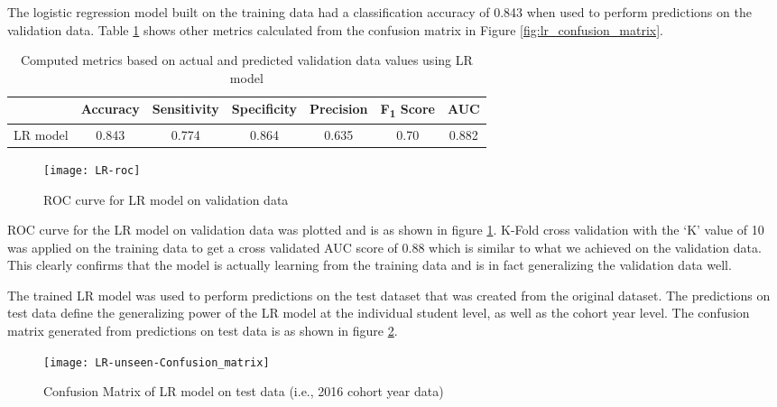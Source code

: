 \documentclass[11pt,openright]{report}
\begin{document}
The logistic regression model built on the training data had a classification accuracy of 0.843 when used to perform predictions on the validation data. Table \ref{table:lr-metrics_db} shows other metrics calculated from the confusion matrix in Figure \ref{fig:lr_confusion_matrix}. 

\begin{table} [!htb]
	\renewcommand{\arraystretch}{1.3}
	\caption{Computed metrics based on actual and predicted validation data values using LR model}
	\label{table:lr-metrics_db}
	\centering
	\begin{tabular}{|c|c|c|c|c|c|c|}
    \hline
  	 & \bfseries Accuracy & \bfseries Sensitivity & \bfseries Specificity & \bfseries Precision & \bfseries F\textsubscript{1} Score  & \bfseries AUC\\  
    \hline
	LR model & 0.843 & 0.774 & 0.864 & 0.635 & 0.70 & 0.882 \\ \hline
	\end{tabular} 
\end{table}


 \begin{figure}[!htb]
	\centering
	\texttt{[image: LR-roc]}
	\caption{ROC curve for LR model on validation data}
	\label{fig:lr_roc}
\end{figure} 

ROC curve for the LR model on validation data was plotted and is as shown in figure \ref{fig:lr_roc}. K-Fold cross validation with the `K' value of 10 was applied on the training data to get a cross validated AUC score of 0.88 which is similar to what we achieved on the validation data. This clearly confirms that the model is actually learning from the training data and is in fact generalizing the validation data well.

The trained LR model was used to perform predictions on the test dataset that was created from the original dataset. The predictions on test data define the generalizing power of the LR model at the individual student level, as well as the cohort year level. The confusion matrix generated from predictions on test data is as shown in figure \ref{fig:lr_unseen_confusion_matrix}.

  \begin{figure}[!htb]
	\centering
	\texttt{[image: LR-unseen-Confusion\_matrix]}
	\caption{Confusion Matrix of LR model on test data (i.e., 2016 cohort year data)}
	\label{fig:lr_unseen_confusion_matrix}
\end{figure} 
\end{document}
